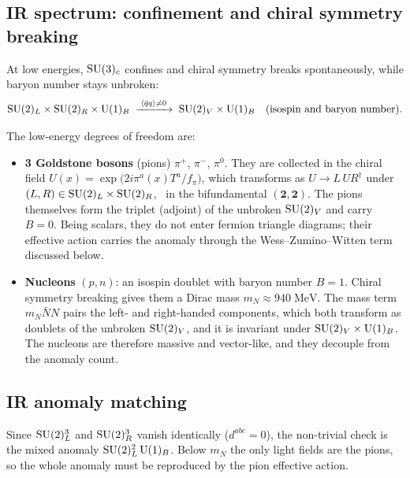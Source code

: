 \documentclass[11pt,a4paper]{article}
\begin{document}
\subsection{IR spectrum: confinement and chiral symmetry breaking}

At low energies, $\mathrm{SU}(3)_c$ confines and chiral symmetry breaks
spontaneously, while baryon number stays unbroken:
\[
  \mathrm{SU}(2)_L \times \mathrm{SU}(2)_R \times \mathrm{U}(1)_B
  \;\xrightarrow{\;\langle\bar{q}q\rangle \neq 0\;}\;
  \mathrm{SU}(2)_V \times \mathrm{U}(1)_B \quad (\text{isospin and baryon number}).
\]

The low-energy degrees of freedom are:
\begin{itemize}
  \item \textbf{3 Goldstone bosons} (pions) $\pi^+$, $\pi^-$, $\pi^0$.
    They are collected in the chiral field
    $U(x) = \exp\bigl(2i\pi^a(x) T^a/f_\pi\bigr)$, which transforms as
    $U \to L\,U R^\dagger$ under $(L, R) \in \mathrm{SU}(2)_L \times \mathrm{SU}(2)_R$,
    \ie\ in the bifundamental $(\mathbf{2}, \mathbf{2})$.  The pions
    themselves form the triplet (adjoint) of the unbroken $\mathrm{SU}(2)_V$ and
    carry $B = 0$.  Being scalars, they do not enter fermion triangle
    diagrams; their effective action carries the anomaly through the
    Wess--Zumino--Witten term discussed below.

  \item \textbf{Nucleons} $(p, n)$: an isospin doublet with baryon number
    $B = 1$.  Chiral symmetry breaking gives them a Dirac mass
    $m_N \approx 940\;\text{MeV}$.  The mass term $m_N \bar{N} N$ pairs the
    left- and right-handed components, which both transform as doublets of
    the unbroken $\mathrm{SU}(2)_V$, and it is invariant under
    $\mathrm{SU}(2)_V \times \mathrm{U}(1)_B$.  The nucleons are therefore massive and
    vector-like, and they decouple from the \IR{} anomaly count.
\end{itemize}

\subsection{IR anomaly matching}

Since $\mathrm{SU}(2)_L^3$ and $\mathrm{SU}(2)_R^3$ vanish identically ($d^{abc}=0$),
the non-trivial check is the mixed anomaly $\mathrm{SU}(2)_L^2\,\mathrm{U}(1)_B$.  Below
$m_N$ the only light fields are the pions, so the whole anomaly must be
reproduced by the pion effective action.
\end{document}
